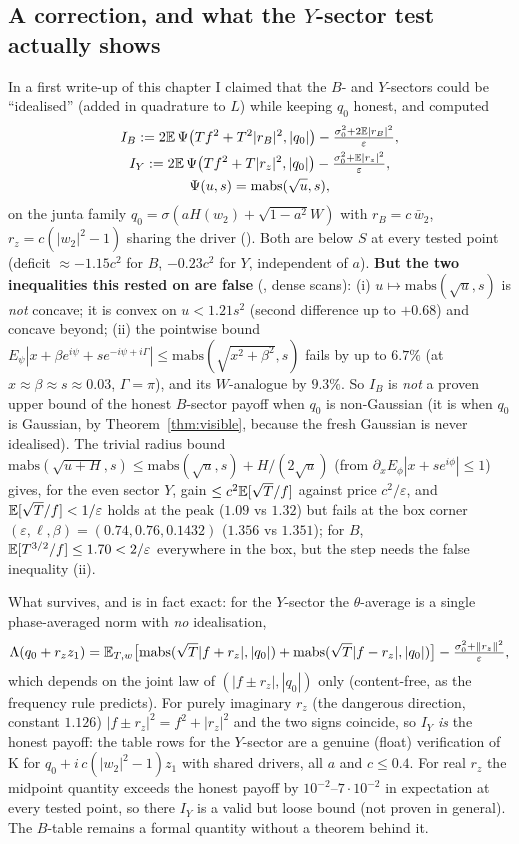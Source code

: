 \subsection{A correction, and what the $Y$-sector test actually shows}\label{sec:idealBY}
In a first write-up of this chapter I claimed that the $B$- and $Y$-sectors could be ``idealised'' (added in quadrature to $L$) while keeping $q_0$ honest, and computed
\[\begin{gathered}
I_B:=2\mathbb E\,\Psi\bigl(Tf^2+T^2|r_B|^2,|q_0|\bigr)-\tfrac{\sigma_0^2+2\mathbb E|r_B|^2}\varepsilon,\\
 I_Y:=2\mathbb E\,\Psi\bigl(Tf^2+T|r_z|^2,|q_0|\bigr)-\tfrac{\sigma_0^2+\mathbb E|r_z|^2}\varepsilon,\\
\Psi(u,s)=\mathrm{mabs}(\sqrt u,s),
\end{gathered}\]
on the junta family $q_0=\sigma(aH(w_2)+\sqrt{1-a^2}W)$ with $r_B=c\,\bar w_2$, $r_z=c(|w_2|^2-1)$ sharing the driver (). Both are below $S$ at every tested point
(deficit $\approx-1.15c^2$ for $B$, $-0.23c^2$ for $Y$, independent of $a$). \textbf{But the two inequalities this rested on are false} (, dense scans):
(i) $u\mapsto\mathrm{mabs}(\sqrt u,s)$ is \emph{not} concave; it is convex on $u<1.21s^2$ (second difference up to $+0.68$) and concave beyond; (ii) the pointwise bound
$E_\psi|x+\beta e^{i\psi}+se^{-i\psi+i\Gamma}|\le\mathrm{mabs}(\sqrt{x^2+\beta^2},s)$ fails by up to $6.7\%$ (at $x\approx\beta\approx s\approx0.03$, $\Gamma=\pi$), and its $W$-analogue by $9.3\%$.
So $I_B$ is \emph{not} a proven upper bound of the honest $B$-sector payoff when $q_0$ is non-Gaussian (it is when $q_0$ is Gaussian, by Theorem~\ref{thm:visible}, because the fresh
Gaussian is never idealised). The trivial radius bound $\mathrm{mabs}(\sqrt{u+H},s)\le\mathrm{mabs}(\sqrt u,s)+H/(2\sqrt u)$ (from $\partial_x E_\phi|x+se^{i\phi}|\le1$) gives, for the
even sector $Y$, gain $\le c^2\mathbb E[\sqrt T/f]$ against price $c^2/\varepsilon$, and $\mathbb E[\sqrt T/f]<1/\varepsilon$ holds at the peak ($1.09$ vs $1.32$) but fails at the box corner
$(\varepsilon,\ell,\beta)=(0.74,0.76,0.1432)$ ($1.356$ vs $1.351$); for $B$, $\mathbb E[T^{3/2}/f]\le1.70<2/\varepsilon$ everywhere in the box, but the step needs the false inequality (ii).

What survives, and is in fact exact: for the $Y$-sector the $\theta$-average is a single phase-averaged norm with \emph{no} idealisation,
\[
\Lambda(q_0+r_zz_1)=\mathbb E_{T,w}\bigl[\mathrm{mabs}(\sqrt T|f+r_z|,|q_0|)+\mathrm{mabs}(\sqrt T|f-r_z|,|q_0|)\bigr]-\tfrac{\sigma_0^2+\|r_z\|^2}\varepsilon,
\]
which depends on the joint law of $(|f\pm r_z|,|q_0|)$ only (content-free, as the frequency rule predicts). For purely imaginary $r_z$ (the dangerous direction, constant $1.126$)
$|f\pm r_z|^2=f^2+|r_z|^2$ and the two signs coincide, so $I_Y$ \emph{is} the honest payoff: the table rows for the $Y$-sector are a genuine (float) verification of K for
$q_0+i\,c(|w_2|^2-1)z_1$ with shared drivers, all $a$ and $c\le0.4$. For real $r_z$ the midpoint quantity exceeds the honest payoff by $10^{-2}$--$7\cdot10^{-2}$ in expectation at
every tested point, so there $I_Y$ is a valid but loose bound (not proven in general). The $B$-table remains a formal quantity without a theorem behind it.

